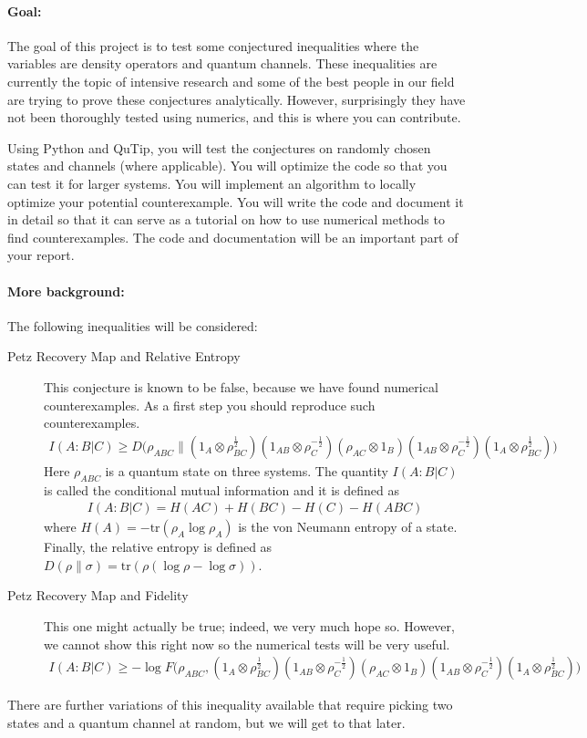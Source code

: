 \documentclass[aps,pra,onecolumn,nofootinbib,superscriptaddress,tightenlines,
notitlepage,12pt]{revtex4-1}
\newcommand{\tr}{\mathrm{tr}}
\begin{document}
\paragraph*{Goal:}
The goal of this project is to test some conjectured inequalities where the variables are density operators and quantum channels. These inequalities are currently the topic of intensive research and some of the best people in our field are trying to prove these conjectures analytically. However, surprisingly they have not been thoroughly tested using numerics, and this is where you can contribute. 

Using Python and QuTip, you will test the conjectures on randomly chosen states and channels (where applicable). You will optimize the code so that you can test it for larger systems. You will implement an algorithm to locally optimize your potential counterexample. You will write the code and document it in detail so that it can serve as a tutorial on how to use numerical methods to find counterexamples. The code and documentation will be an important part of your report.

\paragraph*{More background:}
The following inequalities will be considered:
\begin{description}
  \item[Petz Recovery Map and Relative Entropy]
    This conjecture is known to be false, because we have found numerical counterexamples. As a first step you should reproduce such counterexamples.
   \begin{align}
     I(A:B|C) \geq D \Big(\rho_{ABC} \Big\| (1_A \otimes \rho_{BC}^{\frac12})  (1_{AB} \otimes \rho_{C}^{-\frac12}) (\rho_{AC} \otimes 1_B) (1_{AB} \otimes \rho_{C}^{-\frac12} ) (1_A \otimes \rho_{BC}^{\frac12}) \Big)
   \end{align}
   Here $\rho_{ABC}$ is a quantum state on three systems. The quantity $I(A:B|C)$ is called the conditional mutual information and it is defined as
   \begin{align}
     I(A:B|C) = H(AC) + H(BC) - H(C) - H(ABC)
   \end{align}
   where $H(A) = -\tr (\rho_A \log \rho_A)$ is the von Neumann entropy of a state. Finally, the relative entropy is defined as $D(\rho\|\sigma) = \tr(\rho (\log \rho - \log \sigma))$.

  \item[Petz Recovery Map and Fidelity] This one might actually be true; indeed, we very much hope so. However, we cannot show this right now so the numerical tests will be very useful.
  \begin{align}
I(A:B|C) \geq -\log F \Big(\rho_{ABC} , (1_A \otimes \rho_{BC}^{\frac12})  (1_{AB} \otimes \rho_{C}^{-\frac12}) (\rho_{AC} \otimes 1_B) (1_{AB} \otimes \rho_{C}^{-\frac12} ) (1_A \otimes \rho_{BC}^{\frac12}) \Big)
  \end{align}
     
\end{description}

There are further variations of this inequality available that require picking two states and a quantum channel at random, but we will get to that later. 





\end{document}
